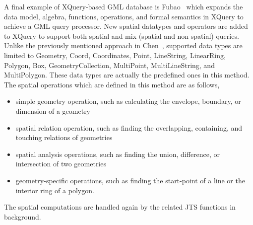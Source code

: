 \documentclass[a4paper,12pt]{article}
\begin{document}
A final example of XQuery-based GML database is Fubao~\cite{Fubao2010}
which expands the data model, algebra, functions, operations, and formal semantics in XQuery 
to achieve a GML query processor. New spatial datatypes and operators are added to XQuery to support both spatial and mix (spatial and non-spatial) queries. Unlike the previously mentioned approach in Chen~\cite{Chen2010}, supported data types are limited to Geometry, Coord, Coordinates, Point, LineString, LinearRing, Polygon, Box, GeometryCollection, MultiPoint, MultiLineString, and MultiPolygon. 
These data types are actually the predefined ones in this method.
The spatial operations which are defined in this method are as follows,
\begin{itemize}
\item simple geometry operation, such as calculating the envelope, boundary, or dimension of a geometry
\item spatial relation operation, such as finding the overlapping, containing, and touching relations of geometries
\item spatial analysis operations, such as finding the union, difference, or intersection of two geometries
\item geometry-specific operations, such as finding the start-point of a line or the interior ring of a polygon.
\end{itemize}
The spatial computations are handled again by the related JTS functions in background.



\end{document}

